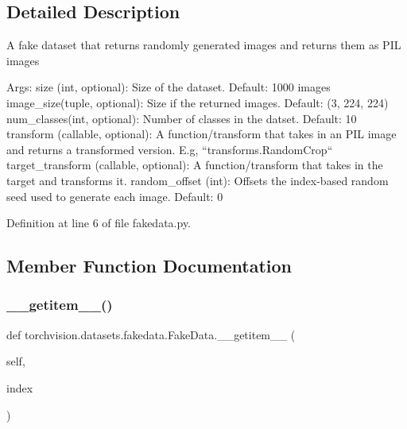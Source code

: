 \subsection{Detailed Description}
\begin{DoxyVerb}A fake dataset that returns randomly generated images and returns them as PIL images

Args:
    size (int, optional): Size of the dataset. Default: 1000 images
    image_size(tuple, optional): Size if the returned images. Default: (3, 224, 224)
    num_classes(int, optional): Number of classes in the datset. Default: 10
    transform (callable, optional): A function/transform that  takes in an PIL image
        and returns a transformed version. E.g, ``transforms.RandomCrop``
    target_transform (callable, optional): A function/transform that takes in the
        target and transforms it.
    random_offset (int): Offsets the index-based random seed used to
        generate each image. Default: 0\end{DoxyVerb}
 

Definition at line 6 of file fakedata.\+py.



\subsection{Member Function Documentation}
\mbox{\label{classtorchvision_1_1datasets_1_1fakedata_1_1FakeData_aeb080af0a0bff5c62e2308cabda27ee1}} 
\subsubsection{\texorpdfstring{\+\_\+\+\_\+getitem\+\_\+\+\_\+()}{\_\_getitem\_\_()}}
{\footnotesize\ttfamily def torchvision.\+datasets.\+fakedata.\+Fake\+Data.\+\_\+\+\_\+getitem\+\_\+\+\_\+ (\begin{DoxyParamCaption}\item[{}]{self,  }\item[{}]{index }\end{DoxyParamCaption})}

